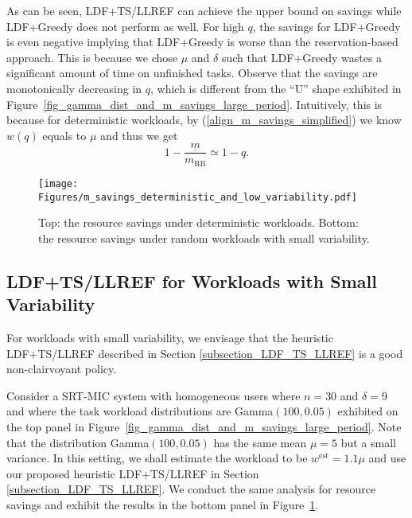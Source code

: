 \documentclass[prodmode,acmtompecs]{acmsmall}
\newcommand{\myComments}[1]{}
\newif\ifdissertation
\newcommand{\dissertationStart}{\ifdissertation  \myComments{Dissertation version: }}
\newcommand{\commentEnd}{\myComments{End}}
\begin{document}
As can be seen, LDF+TS/LLREF can achieve the upper bound on savings while LDF+Greedy does not perform as well. 
For high $q$, the savings for LDF+Greedy is even negative implying that LDF+Greedy is worse than the reservation-based approach. 
This is because we chose $\mu$ and $\delta$ such that LDF+Greedy wastes a significant amount of time on unfinished tasks. 
Observe that the savings are monotonically decreasing in $q$, which is different from the ``U'' shape exhibited in Figure~{\ref{fig_gamma_dist_and_m_savings_large_period}}. Intuitively, this is because for deterministic workloads, by (\ref{align_m_savings_simplified}) we know $w(q)$ equals to $\mu$ and thus we get
$$
1 - \frac{\underline{m}}{m_{\text{RB}}} \simeq 1 - q. 
$$

\begin{figure}[htp]
  \centering
  \texttt{[image: Figures/m\_savings\_deterministic\_and\_low\_variability.pdf]}
  \caption{Top: the resource savings under deterministic workloads. Bottom: the resource savings under random workloads with small variability. }
  \label{fig_m_savings_deterministic_and_low_variability}
\end{figure}

\subsection{LDF+TS/LLREF for Workloads with Small Variability}
\label{subsubsection_heuristic_TS_LLREF_small_var}
For workloads with small variability, we envisage that the heuristic LDF+TS/LLREF described in Section \ref{subsection_LDF_TS_LLREF} is a good non-clairvoyant policy. 
\dissertationStart
For non-deterministic workloads, the LDF+TS/LLREF policy requires knowledge of workload realizations and so is not non-clairvoyant. 
However, we envisage that the heuristic estimation based LDF+TS/LLREF described in \ref{subsection_LDF_TS_LLREF} can be a good non-clairvoyant generalization, especially for random NBUE workloads with small variability. 
\commentEnd\fi
Consider a SRT-MIC system with homogeneous users where $n = 30$ and $\delta = 9$ and where the task workload distributions are Gamma$(100, 0.05)$ exhibited on the top panel in Figure~{\ref{fig_gamma_dist_and_m_savings_large_period}}. 
Note that the distribution Gamma$(100, 0.05)$ has the same mean $\mu = 5$ but a small variance. In this setting, we shall estimate the workload to be $w^\text{est} = 1.1\mu$ and use our proposed heuristic LDF+TS/LLREF in Section \ref{subsection_LDF_TS_LLREF}. 
We conduct the same analysis for resource savings and exhibit the results in the bottom panel in Figure~{\ref{fig_m_savings_deterministic_and_low_variability}}. 
\end{document}
